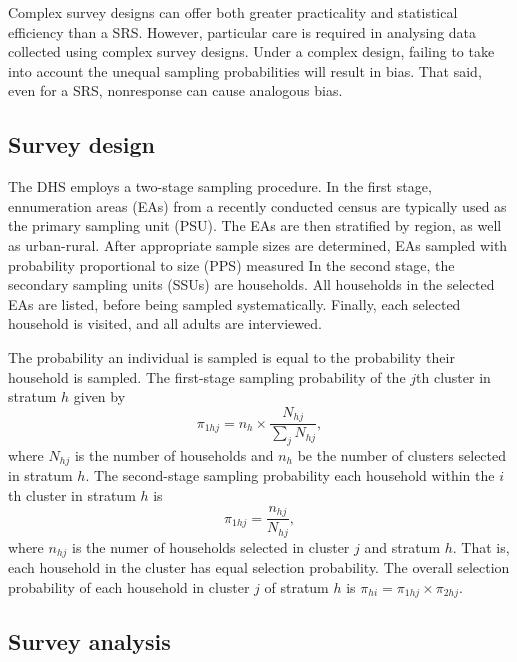 \documentclass[a4paper, nobind]{templates/ociamthesis}
\begin{document}
Complex survey designs can offer both greater practicality and statistical efficiency than a SRS.
However, particular care is required in analysing data collected using complex survey designs.
Under a complex design, failing to take into account the unequal sampling probabilities will result in bias.
That said, even for a SRS, nonresponse can cause analogous bias.

\hypertarget{survey-design}{%
\subsection{Survey design}\label{survey-design}}

The DHS \autocite{measure2012sampling} employs a two-stage sampling procedure.
In the first stage, ennumeration areas (EAs) from a recently conducted census are typically used as the primary sampling unit (PSU).
The EAs are then stratified by region, as well as urban-rural.
After appropriate sample sizes are determined, EAs sampled with probability proportional to size (PPS) measured
In the second stage, the secondary sampling units (SSUs) are households.
All households in the selected EAs are listed, before being sampled systematically.
Finally, each selected household is visited, and all adults are interviewed.

The probability an individual is sampled is equal to the probability their household is sampled.
The first-stage sampling probability of the \(j\)th cluster in stratum \(h\) given by
\begin{equation}
\pi_{1hj} = n_h \times \frac{N_{hj}}{\sum_j N_{hj}},
\end{equation}
where \(N_{hj}\) is the number of households and \(n_h\) be the number of clusters selected in stratum \(h\).
The second-stage sampling probability each household within the \(i\)th cluster in stratum \(h\) is
\begin{equation}
\pi_{1hj} = \frac{n_{hj}}{N_{hj}},
\end{equation}
where \(n_{hj}\) is the numer of households selected in cluster \(j\) and stratum \(h\).
That is, each household in the cluster has equal selection probability.
The overall selection probability of each household in cluster \(j\) of stratum \(h\) is \(\pi_{hi} = \pi_{1hj} \times \pi_{2hj}\).

\hypertarget{survey-analysis}{%
\subsection{Survey analysis}\label{survey-analysis}}
\end{document}
